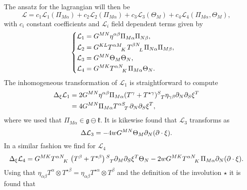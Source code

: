 The ansatz for the lagrangian will then be
\begin{equation}
    \mathcal{L} = c_1\mathcal{L}_1(\Pi_{M\alpha})+c_2\mathcal{L}_2(\Pi_{M\alpha})+c_3\mathcal{L}_3(\Theta_M)+c_4\mathcal{L}_4(\Pi_{M\alpha},\Theta_M),
\end{equation}
with $c_i$ constant coefficients and $\mathcal{L}_i$ field dependent terms given by 
\begin{equation}
    \begin{cases}\begin{aligned}
        \mathcal{L}_1 &= G^{MN}\eta^{\alpha\beta}\Pi_{M\alpha}\Pi_{N\beta},\\
        \mathcal{L}_2 &= G^{KL}\tensor{T}{^{\alpha M}_K}\tensor{T}{^{\beta N}_L}\Pi_{N\alpha}\Pi_{M\beta},\\
        \mathcal{L}_3 &= G^{MN}\Theta_M\Theta_N,\\
        \mathcal{L}_4 &= G^{MK}\tensor{T}{^{\alpha N}_K}\Pi_{M\alpha}\Theta_{N}.
    \end{aligned}
    \end{cases}
\end{equation}
The inhomogeneous transformation of $\mathcal{L}_1$ is straightforward to compute
\begin{equation}
    \begin{aligned}
        \Delta_\xi \mathcal{L}_1 &= 2G^{MN}\eta^{\alpha\beta}\Pi_{M\alpha}(T^{\gamma}+T^{\star\gamma})\tensor{}{^S_T}\eta_{\gamma\beta}\pd_N\pd_S\xi^T\\
        &= 4G^{MN}\Pi_{M\alpha}\tensor{T}{^{\alpha S}_T}\pd_N\pd_S\xi^T,
    \end{aligned}
\end{equation}
where we used that $\Pi_{M\alpha}\in\mathfrak{g}\ominus\mathfrak{k}$. It is kikewise found that $\mathcal{L}_3$ transforms as 
\begin{equation}
    \Delta \mathcal{L}_3 = -4wG^{MN}\Theta_M\partial_N(\partial\cdot \xi).
\end{equation}
In a similar fashion we find for $\mathcal{L}_4$  
\begin{equation}
        \Delta_\xi \mathcal{L}_4 = G^{MK}\tensor{T}{^{\alpha N}_K}\left(T^\beta+T^{\star\beta}\right)\tensor{}{^S_T}\pd_M\pd_S\xi^T\Theta_N-2wG^{MK}\tensor{T}{^{\alpha N}_K}\Pi_{M\alpha}\pd_N(\pd\cdot \xi).
\end{equation}
Using that $\eta_{\alpha\beta}T^\alpha\otimes T^{\star\beta} = \eta_{\alpha\beta}T^{\star\alpha}\otimes T^{\beta}$ and the definition of the involution $\star$ it is found that
